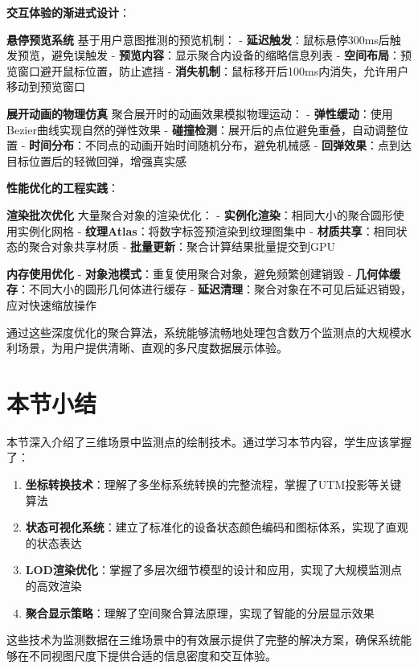 \textbf{交互体验的渐进式设计}：

\textbf{悬停预览系统} 基于用户意图推测的预览机制： - \textbf{延迟触发}：鼠标悬停300ms后触发预览，避免误触发 - \textbf{预览内容}：显示聚合内设备的缩略信息列表 - \textbf{空间布局}：预览窗口避开鼠标位置，防止遮挡 - \textbf{消失机制}：鼠标移开后100ms内消失，允许用户移动到预览窗口

\textbf{展开动画的物理仿真} 聚合展开时的动画效果模拟物理运动： - \textbf{弹性缓动}：使用Bezier曲线实现自然的弹性效果 - \textbf{碰撞检测}：展开后的点位避免重叠，自动调整位置 - \textbf{时间分布}：不同点的动画开始时间随机分布，避免机械感 - \textbf{回弹效果}：点到达目标位置后的轻微回弹，增强真实感

\textbf{性能优化的工程实践}：

\textbf{渲染批次优化} 大量聚合对象的渲染优化： - \textbf{实例化渲染}：相同大小的聚合圆形使用实例化网格 - \textbf{纹理Atlas}：将数字标签预渲染到纹理图集中 - \textbf{材质共享}：相同状态的聚合对象共享材质 - \textbf{批量更新}：聚合计算结果批量提交到GPU

\textbf{内存使用优化} - \textbf{对象池模式}：重复使用聚合对象，避免频繁创建销毁 - \textbf{几何体缓存}：不同大小的圆形几何体进行缓存 - \textbf{延迟清理}：聚合对象在不可见后延迟销毁，应对快速缩放操作

通过这些深度优化的聚合算法，系统能够流畅地处理包含数万个监测点的大规模水利场景，为用户提供清晰、直观的多尺度数据展示体验。

\section{本节小结}

本节深入介绍了三维场景中监测点的绘制技术。通过学习本节内容，学生应该掌握了：

\begin{enumerate}
\def\labelenumi{\arabic{enumi}.}
\tightlist
\item
  \textbf{坐标转换技术}：理解了多坐标系统转换的完整流程，掌握了UTM投影等关键算法
\item
  \textbf{状态可视化系统}：建立了标准化的设备状态颜色编码和图标体系，实现了直观的状态表达
\item
  \textbf{LOD渲染优化}：掌握了多层次细节模型的设计和应用，实现了大规模监测点的高效渲染
\item
  \textbf{聚合显示策略}：理解了空间聚合算法原理，实现了智能的分层显示效果
\end{enumerate}

这些技术为监测数据在三维场景中的有效展示提供了完整的解决方案，确保系统能够在不同视图尺度下提供合适的信息密度和交互体验。

